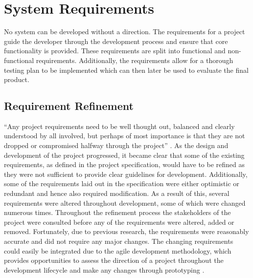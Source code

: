 \chapter{System Requirements}
\label{Chapter:SystemRequirements}
No system can be developed without a direction. The requirements for a project guide the developer through the development process and ensure that core functionality is provided. These requirements are split into functional and non-functional requirements. Additionally, the requirements allow for a thorough testing plan to be implemented which can then later be used to evaluate the final product. 

\section{Requirement Refinement}
``Any project requirements need to be well thought out, balanced and clearly understood by all involved, but perhaps of most importance is that they are not dropped or compromised halfway through the project'' \cite{ReQTest:Requirements}. As the design and development of the project progressed, it became clear that some of the existing requirements, as defined in the project specification, would have to be refined as they were not sufficient to provide clear guidelines for development. Additionally, some of the requirements laid out in the specification were either optimistic or redundant and hence also required modification. As a result of this, several requirements were altered throughout development, some of which were changed numerous times. Throughout the refinement process the stakeholders of the project were consulted before any of the requirements were altered, added or removed. Fortunately, due to previous research, the requirements were reasonably accurate and did not require any major changes. The changing requirements could easily be integrated due to the agile development methodology, which provides opportunities to assess the direction of a project throughout the development lifecycle and make any changes through prototyping \cite{Agile:Home}.

